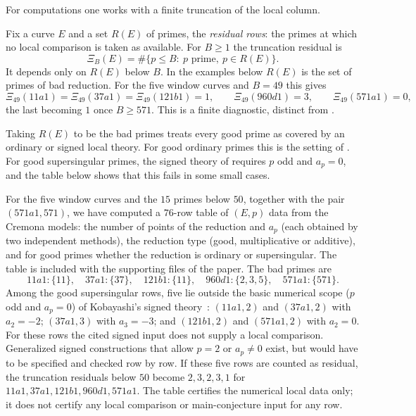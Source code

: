 \documentclass[11pt]{article}
\theoremstyle{definition}
\begin{document}
For computations one works with a finite truncation of the local column.

\begin{definition}\label{def:apparatus:support-prime-truncation-residual}
Fix a curve $E$ and a set $R(E)$ of primes, the \emph{residual rows}: the
primes at which no local comparison is taken as available.  For $B\ge1$
the truncation residual is
\[
  \Xi_B(E)=\#\{p\le B:\ p\text{ prime},\ p\in R(E)\}.
\]
It depends only on $R(E)$ below $B$.  In the examples below $R(E)$ is the
set of primes of bad reduction.  For the five window curves and $B=49$
this gives
\[
  \Xi_{49}(11a1)=\Xi_{49}(37a1)=\Xi_{49}(121b1)=1,\qquad
  \Xi_{49}(960d1)=3,\qquad
  \Xi_{49}(571a1)=0,
\]
the last becoming $1$ once $B\ge571$.  This is a finite diagnostic,
distinct from .
\end{definition}

Taking $R(E)$ to be the bad primes treats every good prime as covered by
an ordinary or signed local theory.  For good ordinary primes this is the
setting of .  For good
supersingular primes, the signed theory of
 requires $p$ odd and $a_p=0$, and the
table below shows that this fails in some small cases.

\begin{remark}\label{rmk:apparatus:support-prime-atlas}
For the five window curves and the $15$ primes below $50$, together with
the pair $(571a1,571)$, we have computed a $76$-row table of
$(E,p)$ data from the Cremona models: the number of points of the
reduction and $a_p$ (each obtained by two independent methods), the
reduction type (good, multiplicative or additive), and for good primes
whether the reduction is ordinary or supersingular.  The table is
included with the supporting files of the paper.  The bad primes are
\[
  11a1:\{11\},\quad
  37a1:\{37\},\quad
  121b1:\{11\},\quad
  960d1:\{2,3,5\},\quad
  571a1:\{571\}.
\]
Among the good supersingular rows, five lie outside the basic numerical
scope ($p$ odd and $a_p=0$) of Kobayashi's signed
theory~\citep{Kobayashi2003}: $(11a1,2)$ and $(37a1,2)$ with $a_2=-2$;
$(37a1,3)$ with $a_3=-3$; and $(121b1,2)$ and $(571a1,2)$ with $a_2=0$.
For these rows the cited signed input does not supply a local comparison.
Generalized signed constructions that allow $p=2$ or $a_p\neq0$ exist,
but would have to be specified and checked row by row.  If these five
rows are counted as residual, the truncation residuals below $50$ become
$2,3,2,3,1$ for $11a1,37a1,121b1,960d1,571a1$.  The table certifies
the numerical local data only; it does not certify any local comparison
or main-conjecture input for any row.
\end{remark}
\end{document}
